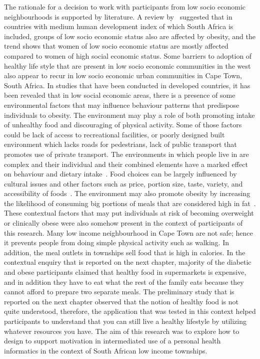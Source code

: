 The rationale for a decision to work with participants from low socio economic neighbourhoods is supported by literature. A review by~\cite{dinsa2012obesity} suggested that in countries with medium human development index of which South Africa is included, groups of low socio economic status  also are affected by obesity, and the trend shows that women of low socio economic status are mostly affected compared to women of high social economic status. Some barriers to adoption of healthy life style that are present in low socio economic communities in the west also appear to recur in low socio economic urban communities in Cape Town, South Africa. In studies that have been conducted in developed countries, it has been revealed that in low social economic areas, there is a presence of some environmental factors that may influence behaviour patterns that predispose individuals to obesity. The environment may play a role of both promoting intake of unhealthy food and discouraging of physical activity. Some of those factors could be lack of access to recreational facilities, or poorly designed built environment which lacks roads for pedestrians, lack of public transport that promotes use of private transport. The environments in which people live in are complex and their individual and their combined elements have a marked effect on behaviour and dietary intake~\citep{swinburn2004diet}. Food choices can be largely influenced by cultural issues and other factors such as price, portion size, taste, variety, and accessibility of foods~\citep{ali2009factors}. The environment may also promote obesity by increasing the likelihood of consuming big portions of meals that are considered high in fat~\citep{hill1998environmental}. These contextual factors that may put individuals at risk of becoming overweight or clinically obese were also somehow present in the context of participants of this research. Many low income neighbourhood in Cape Town are not safe; hence it prevents people from doing simple physical activity such as walking. In addition, the meal outlets in townships sell food that is high in calories. In the contextual enquiry that is reported on the next chapter, majority of the diabetic and obese participants claimed that healthy food in supermarkets is expensive, and in addition they have to eat what the rest of the family eats because they cannot afford to prepare two separate meals. The preliminary study that is reported on the next chapter observed that the notion of healthy food is not quite understood, therefore, the application that was tested in this context helped participants to understand that you can still live a healthy lifestyle by utilizing whatever resources you have. The aim of this research was to explore how to design to support motivation in intermediated use of a personal health informatics in the context of South African low income townships. 

